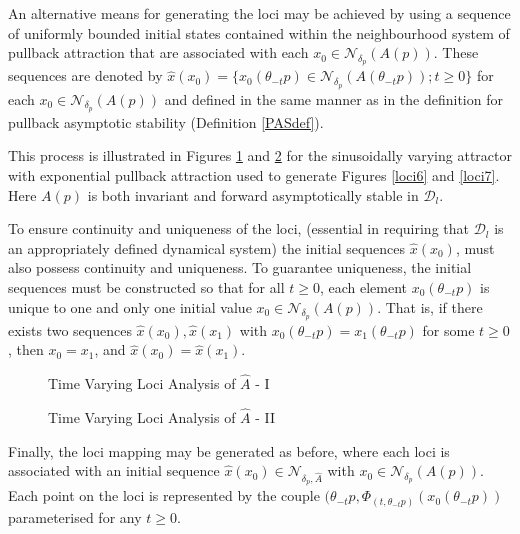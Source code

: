 An alternative means for generating the loci may be achieved by
using a sequence of uniformly bounded initial states contained within the
neighbourhood system of pullback attraction that are associated with each $x_0
\in \mathcal{N}_{\delta_p}(A(p))$. These sequences are denoted by $\hat{x}(x_0)
= \{x_0(\theta_{-t}p) \in \mathcal{N}_{\delta_p}(A(\theta_{-t}p)); t \geq 0 \}$
for each $x_0 \in \mathcal{N}_{\delta_p}(A(p))$ and defined in the same manner
as in the definition for pullback asymptotic stability (Definition
\ref{PASdef}).

This process is illustrated in Figures \ref{loci8} and
\ref{loci9} for the sinusoidally varying attractor with exponential pullback
attraction used to generate Figures \ref{loci6} and \ref{loci7}. Here $A(p)$ is
both invariant and forward asymptotically stable in $\mathcal{D}_l$.

To ensure continuity and uniqueness of the loci, (essential in requiring that
$\mathcal{D}_l$ is an appropriately defined dynamical system) the initial
sequences $\hat{x}(x_0)$, must also possess continuity and uniqueness. To
guarantee uniqueness, the initial sequences must be constructed so that for all
$t \geq 0$, each element $x_0(\theta_{-t}p)$ is unique to one and only one
initial value $x_0 \in \mathcal{N}_{\delta_p}(A(p))$. That is, if there exists
two sequences $\hat{x}(x_0), \hat{x}(x_1)$ with $x_0(\theta_{-t}p) =
x_1(\theta_{-t}p)$ for some $t \geq 0$, then $x_0 = x_1$, and $\hat{x}(x_0) =
\hat{x}(x_1)$.

\begin{figure}[htb]
\begin{center}
 \caption{Time Varying Loci Analysis of $\hat{A}$ - I}
\protect\label{loci8}
\end{center}
\end{figure}

\begin{figure}[htb]
\begin{center}
 \caption{Time Varying Loci Analysis of $\hat{A}$ - II}
\protect\label{loci9}
\end{center}
\end{figure}

Finally, the loci mapping may be generated as before, where
each loci is associated with an initial sequence $\hat{x}(x_0) \in
\mathcal{N}_{\delta_p, \hat{A}}$ with $x_0 \in \mathcal{N}_{\delta_p}(A(p))$.
Each point on the loci is represented by the couple $(\theta_{-t}p, \Phi_{(t,
\theta_{-t}p)}(x_0(\theta_{-t}p))$ parameterised for any $t \geq 0$.


